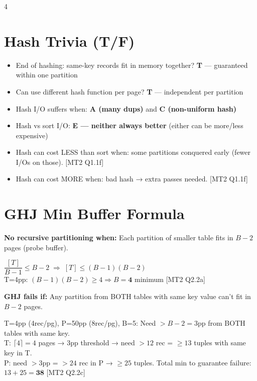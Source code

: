 \documentclass[8pt,letterpaper]{article}
\newcommand{\key}[1]{\textbf{\color{red!70!black}#1}}
\newcommand{\ans}[1]{\textbf{\color{blue!80!black}#1}}
\newcommand{\qref}[1]{{\fontsize{3.5}{4}\selectfont\color{purple!60!black}[#1]}}
\begin{document}
\begin{multicols*}{4}
\section{Hash Trivia (T/F)}
\begin{itemize}
  \item End of hashing: same-key records fit in memory together? \ans{T} — guaranteed within one partition
  \item Can use different hash function per page? \ans{T} — independent per partition
  \item Hash I/O suffers when: \ans{A (many dups)} and \ans{C (non-uniform hash)}
  \item Hash vs sort I/O: \ans{E — neither always better} (either can be more/less expensive)
  \item Hash can cost LESS than sort when: some partitions conquered early (fewer I/Os on those). \qref{MT2 Q1.1f}
  \item Hash can cost MORE when: bad hash → extra passes needed. \qref{MT2 Q1.1f}
\end{itemize}

\section{GHJ Min Buffer Formula}
\key{No recursive partitioning when:} Each partition of smaller table fits in $B-2$ pages (probe buffer).
\begin{ansbox}
$\dfrac{[T]}{B-1} \le B-2 \;\Rightarrow\; [T] \le (B-1)(B-2)$\\
T=4pp: $(B-1)(B-2)\ge4 \Rightarrow B=\mathbf{4}$ minimum \qref{MT2 Q2.2a}
\end{ansbox}

\key{GHJ fails if:} Any partition from BOTH tables with same key value can't fit in $B-2$ pages.
\begin{ansbox}
T=4pp (4rec/pg), P=50pp (8rec/pg), B=5: Need $>B-2=3$pp from BOTH tables with same key.\\
T: $\lceil4\rceil=4$ pages → $3$pp threshold → need $>12$ rec = $\ge13$ tuples with same key in T.\\
P: need $>3$pp = $>24$ rec in P → $\ge25$ tuples. Total min to guarantee failure: $13+25=\mathbf{38}$ \qref{MT2 Q2.2c}
\end{ansbox}

\end{multicols*}
\newpage
\end{document}
